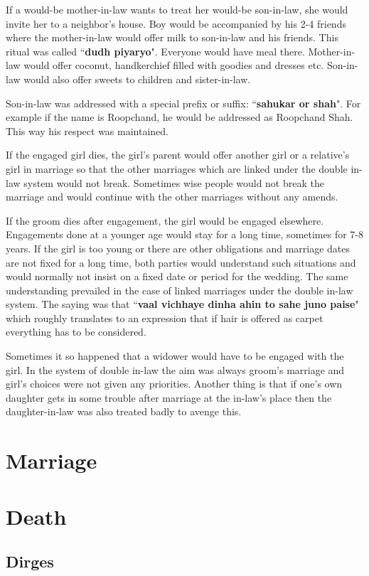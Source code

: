 If a would-be mother-in-law wants to treat her would-be son-in-law, she would
invite her to a neighbor's house. Boy would be accompanied by his 2-4 friends
where the mother-in-law would offer milk to son-in-law and his friends. This
ritual was called ``\textbf{dudh piyaryo}". Everyone would have meal there.
Mother-in-law would offer coconut, handkerchief filled with goodies and dresses
etc. Son-in-law would also offer sweets to children and sister-in-law. 

Son-in-law was addressed with a special prefix or suffix: ``\textbf{sahukar or
shah}". For example if the name is Roopchand, he would be addressed as
Roopchand Shah. This way his respect was maintained.

If the engaged girl dies, the girl's parent would offer another girl or a
relative's girl in marriage so that the other marriages which are linked under
the double in-law system would not break. Sometimes wise people would not break
the marriage and would continue with the other marriages without any amends.

If the groom dies after engagement, the girl would be engaged elsewhere.
Engagements done at a younger age would stay for a long  time, sometimes for
7-8 years. If the girl is too young or there are other obligations and marriage
dates are not fixed for a long time, both parties would understand such
situations and would normally not insist on a fixed date or period for the
wedding. The same understanding prevailed in the case of linked marriages under
the double in-law system. The saying was that ``\textbf{vaal vichhaye dinha
ahin to sahe juno paise}" which roughly translates to an expression that if
hair is offered as carpet everything has to be considered.

Sometimes it so happened that a widower would have to be engaged with  the
girl. In the system of double in-law the aim was always groom's marriage and
girl's choices were not given any priorities. Another thing is that if one's
own daughter gets in some trouble after marriage at the in-law's place then the
daughter-in-law was also treated badly to avenge this.

\section{Marriage}

\section{Death}

\subsection{Dirges}
